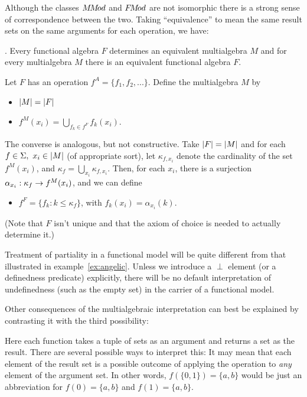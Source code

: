  Although the classes $M\!M\!od$ and 
$F\!M\!od$ are not isomorphic there is a strong sense of correspondence 
between the two. Taking ``equivalence'' to mean the same result sets on the 
same arguments for each operation, we have:
\begin{Claim}\label{prop:26}{\rm \cite{c:127}.} 
Every functional algebra $F$ 
determines an equivalent multialgebra $M$ and for every multialgebra $M$ there is an 
equivalent functional algebra $F$.
\end{Claim}
\begin{Proof}
Let $F$ has an operation $f^A=\{f_1,f_2,...\}$. Define the multialgebra $M$ by
\begin{itemize}\MyLPar
\item $|M| = |F|$
\item $f^M(x_i) =\bigcup_{f_{k}\in f^{F}} f_k(x_i)$.
\end{itemize}
The converse is analogous, but not constructive. Take $|F|=|M|$
and for each $f\in\Sigma,\ x_i\in|M|$ (of appropriate sort), let
$\kappa_{f,x_{i}}$ denote the cardinality of the set $f^M(x_i)$, and
$\kappa_f=\bigcup_{x_{i}}\kappa_{f,x_{i}}$. Then, for each $x_i$, there is a surjection
$\alpha_{x_{i}}:\kappa_f \mathrel{\rightarrow} f^M(x_i)$, and we can define
\begin{itemize}\MyLPar
\item $f^F = \{f_k : k\leq\kappa_f\}$, with $f_k(x_i) = \alpha_{x_{i}}(k)$.
\end{itemize}
(Note that $F$ isn't unique and that the axiom of choice is needed to actually determine it.)
\end{Proof}

Treatment of partiality in a functional model 
will be quite different from that illustrated in example~\ref{ex:angelic}. Unless 
we introduce a $\perp$
 element (or a definedness predicate) explicitly, there will be no 
default interpretation of undefinedness (such as the empty set) in 
the carrier of a functional model. 

Other consequences of the 
multialgebraic interpretation can best be explained by contrasting it 
with the third possibility: 

Here each function takes a tuple of sets as 
an argument and returns a set as the result. There are several
possible ways to interpret this:
It may mean that each element of the result set is a
possible outcome of applying the operation to {\em any} element of the
argument set.  In other words, $f(\{0,1\})=\{a,b\}$ would be just an
abbreviation for $f(0)=\{a,b\}$ and $f(1)=\{a,b\}$.

